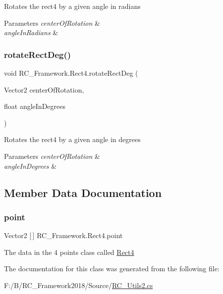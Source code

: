 Rotates the rect4 by a given angle in radians 


\begin{DoxyParams}{Parameters}
{\em center\+Of\+Rotation} & \\
\hline
{\em angle\+In\+Radians} & \\
\hline
\end{DoxyParams}
\mbox{\label{class_r_c___framework_1_1_rect4_ae4d7fe5f04693972d0bf7ccb12b33569}} 
\subsubsection{\texorpdfstring{rotate\+Rect\+Deg()}{rotateRectDeg()}}
{\footnotesize\ttfamily void R\+C\+\_\+\+Framework.\+Rect4.\+rotate\+Rect\+Deg (\begin{DoxyParamCaption}\item[{Vector2}]{center\+Of\+Rotation,  }\item[{float}]{angle\+In\+Degrees }\end{DoxyParamCaption})}



Rotates the rect4 by a given angle in degrees 


\begin{DoxyParams}{Parameters}
{\em center\+Of\+Rotation} & \\
\hline
{\em angle\+In\+Degrees} & \\
\hline
\end{DoxyParams}


\subsection{Member Data Documentation}
\mbox{\label{class_r_c___framework_1_1_rect4_a79615c1338cf98e83e9caeea09c69390}} 
\subsubsection{\texorpdfstring{point}{point}}
{\footnotesize\ttfamily Vector2 \mbox{[}$\,$\mbox{]} R\+C\+\_\+\+Framework.\+Rect4.\+point}



The data in the 4 points class called \mbox{\hyperlink{class_r_c___framework_1_1_rect4}{Rect4}} 



The documentation for this class was generated from the following file\+:\begin{DoxyCompactItemize}
\item 
F\+:/\+B/\+R\+C\+\_\+\+Framework2018/\+Source/\mbox{\hyperlink{_r_c___utils2_8cs}{R\+C\+\_\+\+Utils2.\+cs}}\end{DoxyCompactItemize}
